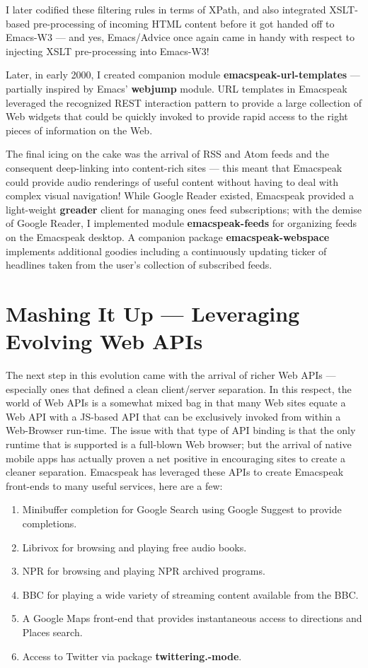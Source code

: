 \documentclass[11pt]{article}
\begin{document}
I later codified these filtering rules in terms of XPath, and
also integrated XSLT-based pre-processing of incoming HTML
content before it got handed off to Emacs-W3 — and yes,
Emacs/Advice once again came in handy with respect to injecting
XSLT pre-processing into Emacs-W3!

Later, in early 2000, I created companion module
\textbf{emacspeak-url-templates} — partially inspired by Emacs'
\textbf{webjump} module. URL templates in Emacspeak leveraged the
recognized REST interaction pattern to provide a large collection
of Web widgets that could be quickly invoked to provide rapid
access to the right pieces of information on the Web.

The final icing on the cake was the arrival of RSS and Atom feeds
and the consequent deep-linking into content-rich sites — this
meant that Emacspeak could provide audio renderings of useful
content without having to deal with complex visual navigation!
While Google Reader existed, Emacspeak provided a light-weight
\textbf{greader} client for managing ones feed subscriptions; with the
demise of Google Reader, I implemented module \textbf{emacspeak-feeds}
for organizing feeds on the Emacspeak desktop. A companion
package \textbf{emacspeak-webspace} implements additional goodies
including a continuously updating ticker of headlines taken from
the user's collection of subscribed feeds.


\section{Mashing It Up —  Leveraging Evolving Web APIs}
\label{sec-15}

The next step in this evolution came with the arrival of richer
Web APIs — especially ones that defined a clean client/server
separation. In this respect, the world of Web APIs is a somewhat
mixed bag in that many Web sites equate a Web API with a JS-based
API that can be exclusively invoked from within a Web-Browser
run-time. The issue with that type of API binding is that the
only runtime that is supported is a full-blown Web browser; but
the arrival of native mobile apps has actually proven a net
positive in encouraging sites to create a cleaner
separation. Emacspeak has leveraged these APIs to create
Emacspeak front-ends to many useful services, here are a few:

\begin{enumerate}
\item Minibuffer completion for Google Search using Google Suggest
to provide completions.
\item Librivox for browsing  and playing free audio books.
\item NPR  for browsing and playing NPR archived programs.
\item BBC for playing a wide variety of streaming content
available from the BBC.
\item A Google Maps front-end that  provides instantaneous access
to directions and Places search.
\item Access to Twitter via package \textbf{twittering.-mode}.
\end{enumerate}
\end{document}
